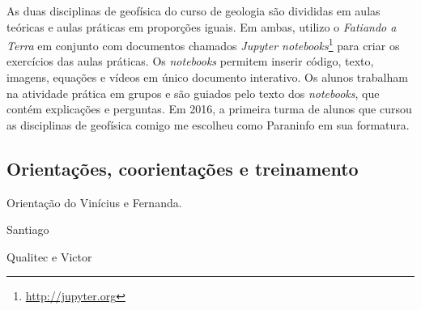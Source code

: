 As duas disciplinas de geofísica do curso de
geologia
são divididas em aulas
teóricas e aulas práticas em proporções iguais.
Em ambas, utilizo o \textit{Fatiando a Terra} em conjunto com documentos
chamados \textit{Jupyter notebooks}\footnote{\url{http://jupyter.org}} para
criar os exercícios das aulas práticas.
Os \textit{notebooks} permitem inserir código, texto, imagens, equações e
vídeos em único documento interativo.
Os alunos trabalham na atividade prática em grupos e são guiados pelo texto dos
\textit{notebooks}, que contém explicações e perguntas.
Em 2016, a primeira turma de alunos que cursou as disciplinas de geofísica
comigo me escolheu como Paraninfo em sua formatura.



\subsection{Orientações, coorientações e treinamento}

Orientação do Vinícius e Fernanda.

Santiago

Qualitec e Victor
